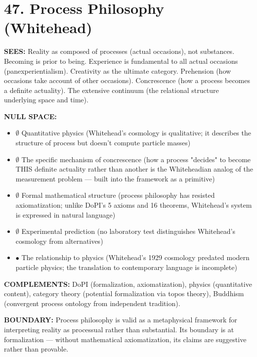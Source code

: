 \bigskip\noindent\makebox[\textwidth]{\color{rulegray}\rule{5cm}{0.3pt}}\bigskip


\section*{47. Process Philosophy (Whitehead)}


\textbf{SEES:} Reality as composed of processes (actual occasions), not substances. Becoming is prior to being. Experience is fundamental to all actual occasions (panexperientialism). Creativity as the ultimate category. Prehension (how occasions take account of other occasions). Concrescence (how a process becomes a definite actuality). The extensive continuum (the relational structure underlying space and time).


\textbf{NULL SPACE:}

\begin{itemize}[nosep,leftmargin=*]
  \item $\emptyset$ Quantitative physics (Whitehead's cosmology is qualitative; it describes the structure of process but doesn't compute particle masses)
  \item $\emptyset$ The specific mechanism of concrescence (how a process "decides" to become THIS definite actuality rather than another is the Whiteheadian analog of the measurement problem — built into the framework as a primitive)
  \item $\emptyset$ Formal mathematical structure (process philosophy has resisted axiomatization; unlike DoPI's 5 axioms and 16 theorems, Whitehead's system is expressed in natural language)
  \item $\emptyset$ Experimental prediction (no laboratory test distinguishes Whitehead's cosmology from alternatives)
  \item $\bullet$ The relationship to physics (Whitehead's 1929 cosmology predated modern particle physics; the translation to contemporary language is incomplete)
\end{itemize}


\textbf{COMPLEMENTS:} DoPI (formalization, axiomatization), physics (quantitative content), category theory (potential formalization via topos theory), Buddhism (convergent process ontology from independent tradition).


\textbf{BOUNDARY:} Process philosophy is valid as a metaphysical framework for interpreting reality as processual rather than substantial. Its boundary is at formalization — without mathematical axiomatization, its claims are suggestive rather than provable.


